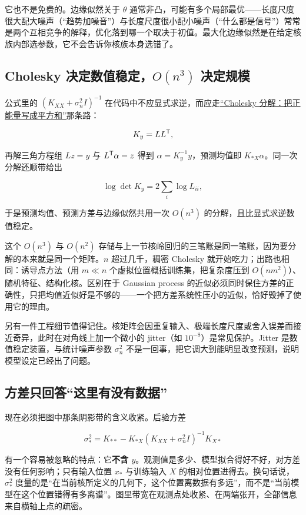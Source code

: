 它也不是免费的。边缘似然关于 \(\theta\) 通常非凸，可能有多个局部最优——长度尺度很大配大噪声（``趋势加噪音''）与长度尺度很小配小噪声（``什么都是信号''）常常是两个互相竞争的解释，优化落到哪一个取决于初值。最大化边缘似然是在给定核族内部选参数，它不会告诉你核族本身选错了。

\subsection{Cholesky 决定数值稳定，\texorpdfstring{\(O(n^3)\)}{O(n3)} 决定规模}

公式里的 \((K_{XX}+\sigma_n^2I)^{-1}\) 在代码中不应显式求逆，而应走\hyperref[sec:03-Linear-Algebra/06-Symmetric-and-Positive-Definite-Matrices/03]{``Cholesky 分解：把正能量写成平方和''}那条路：

\[
K_y=LL^{\mathsf{T}},
\]

再解三角方程组 \(Lz=y\) 与 \(L^{\mathsf{T}}\alpha=z\) 得到 \(\alpha=K_y^{-1}y\)，预测均值即 \(K_{*X}\alpha\)。同一次分解还顺带给出

\[
\log\det K_y=2\sum_i\log L_{ii},
\]

于是预测均值、预测方差与边缘似然共用一次 \(O(n^3)\) 的分解，且比显式求逆数值稳定。

这个 \(O(n^3)\) 与 \(O(n^2)\) 存储与上一节核岭回归的三笔账是同一笔账，因为要分解的本来就是同一个矩阵。\(n\) 超过几千，稠密 Cholesky 就开始吃力；出路也相同：诱导点方法（用 \(m\ll n\) 个虚拟位置概括训练集，把复杂度压到 \(O(nm^2)\)）、随机特征、结构化核。区别在于 Gaussian process 的近似必须同时保住方差的正确性，只把均值近似好是不够的——一个把方差系统性压小的近似，恰好毁掉了使用它的理由。

另有一件工程细节值得记住。核矩阵会因重复输入、极端长度尺度或舍入误差而接近奇异，此时在对角线上加一个微小的 jitter（如 \(10^{-8}\)）是常见保护。Jitter 是数值稳定装置，与统计噪声参数 \(\sigma_n^2\) 不是一回事，把它调大到能明显改变预测，说明模型设定已经出了问题。

\subsection{方差只回答``这里有没有数据''}

现在必须把图中那条阴影带的含义收紧。后验方差

\[
\sigma_*^2=K_{**}-K_{*X}(K_{XX}+\sigma_n^2I)^{-1}K_{X*}
\]

有一个容易被忽略的特点：它\textbf{不含 \(y\)}。观测值是多少、模型拟合得好不好，对方差没有任何影响；只有输入位置 \(x_*\) 与训练输入 \(X\) 的相对位置进得去。换句话说，\(\sigma_*^2\) 度量的是``在当前核所定义的几何下，这个位置离数据有多远''，而不是``当前模型在这个位置错得有多离谱''。图里带宽在观测点处收紧、在两端张开，全部信息来自横轴上点的疏密。


